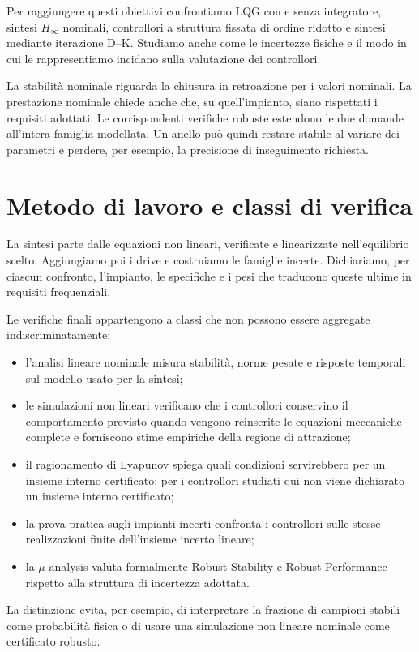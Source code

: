 Per raggiungere questi obiettivi confrontiamo LQG con e senza integratore,
sintesi $H_\infty$ nominali, controllori a struttura fissata di ordine
ridotto e sintesi mediante iterazione D--K. Studiamo anche come le
incertezze fisiche e il modo in cui le rappresentiamo incidano sulla
valutazione dei controllori.

La stabilità nominale riguarda la chiusura in retroazione per i valori
nominali. La prestazione nominale chiede anche che, su quell'impianto,
siano rispettati i requisiti adottati. Le corrispondenti verifiche
robuste estendono le due domande all'intera famiglia modellata.
Un anello può quindi restare stabile al variare dei parametri e
perdere, per esempio, la precisione di inseguimento richiesta.

\section{Metodo di lavoro e classi di verifica}
La sintesi parte dalle equazioni non lineari, verificate e linearizzate
nell'equilibrio scelto. Aggiungiamo poi i drive e costruiamo le famiglie
incerte. Dichiariamo, per ciascun confronto, l'impianto, le specifiche
e i pesi che traducono queste ultime in requisiti frequenziali.

Le verifiche finali appartengono a classi che non possono essere aggregate indiscriminatamente:
\begin{itemize}
\item l'analisi lineare nominale misura stabilità, norme pesate e risposte temporali sul modello usato per la sintesi;
\item le simulazioni non lineari verificano che i controllori conservino il comportamento previsto quando vengono reinserite le equazioni meccaniche complete e forniscono stime empiriche della regione di attrazione;
\item il ragionamento di Lyapunov spiega quali condizioni servirebbero per un insieme interno certificato; per i controllori studiati qui non viene dichiarato un insieme interno certificato;
\item la prova pratica sugli impianti incerti confronta i controllori sulle stesse realizzazioni finite dell'insieme incerto lineare;
\item la $\mu$-analysis valuta formalmente Robust Stability e Robust Performance rispetto alla struttura di incertezza adottata.
\end{itemize}
La distinzione evita, per esempio, di interpretare la frazione di campioni stabili come probabilità fisica o di usare una simulazione non lineare nominale come certificato robusto.

